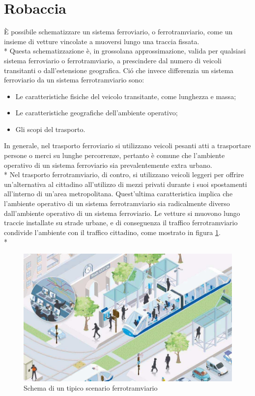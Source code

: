 \section{Robaccia}
\`E possibile schematizzare un sistema ferroviario, o ferrotramviario, come un insieme di vetture vincolate a muoversi lungo una traccia fissata.\\*
Questa schematizzazione \`e, in grossolana approssimazione, valida per qualsiasi sistema ferroviario o ferrotramviario, a prescindere dal numero di veicoli transitanti o dall'estensione geografica. Ci\'o che invece differenzia un sistema ferroviario da un sistema ferrotramviario sono:
\begin{itemize}
		\item Le caratteristiche fisiche del veicolo transitante, come lunghezza e massa;
		\item Le caratteristiche geografiche dell'ambiente operativo;
		\item Gli scopi del trasporto.
\end{itemize}
In generale, nel trasporto ferroviario si utilizzano veicoli pesanti atti a trasportare persone o merci su lunghe percorrenze, pertanto \`e comune che l'ambiente operativo di un sistema ferroviario sia prevalentemente extra urbano.\\*
Nel trasporto ferrotramviario, di contro, si utilizzano veicoli leggeri per offrire un'alternativa al cittadino all'utilizzo di mezzi privati durante i suoi spostamenti all'interno di un'area metropolitana. Quest'ultima caratteristica implica che l'ambiente operativo di un sistema ferrotramviario sia radicalmente diverso dall'ambiente operativo di un sistema ferroviario. Le vetture si muovono lungo traccie installate su strade urbane, e di conseguenza il traffico ferrotramviario condivide l'ambiente con il traffico cittadino, come mostrato in figura \ref{fig:tramschema}.\\*
\begin{figure}[h]
		\centering
		\includegraphics[width=0.7\linewidth]{img/twschema}
		\caption{Schema di un tipico scenario ferrotramviario}
		\label{fig:tramschema}
\end{figure}
